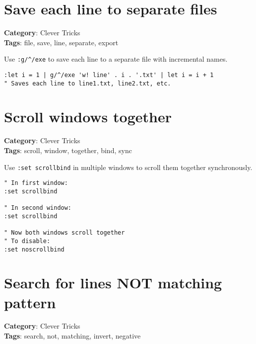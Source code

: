{{\section{Save each line to separate files}

\textbf{Category}: Clever Tricks\\ \textbf{Tags}: file, save, line, separate, export
\vspace{0.5cm}

Use {\footnotesize \Verb§:g/^/exe§} to save each line to a separate file with incremental names.

\begin{Exa*}{}
\begin{Verbatim}[fontsize=\footnotesize, breaklines, breakanywhere]
:let i = 1 | g/^/exe 'w! line' . i . '.txt' | let i = i + 1
" Saves each line to line1.txt, line2.txt, etc.
\end{Verbatim}
\end{Exa*}

\section{Scroll windows together}

\textbf{Category}: Clever Tricks\\ \textbf{Tags}: scroll, window, together, bind, sync
\vspace{0.5cm}

Use {\footnotesize \Verb§:set scrollbind§} in multiple windows to scroll them together synchronously.

\begin{Exa*}{}
\begin{Verbatim}[fontsize=\footnotesize, breaklines, breakanywhere]
" In first window:
:set scrollbind

" In second window:
:set scrollbind

" Now both windows scroll together
" To disable:
:set noscrollbind
\end{Verbatim}
\end{Exa*}

\section{Search for lines NOT matching pattern}

\textbf{Category}: Clever Tricks\\ \textbf{Tags}: search, not, matching, invert, negative
\vspace{0.5cm}

}}
